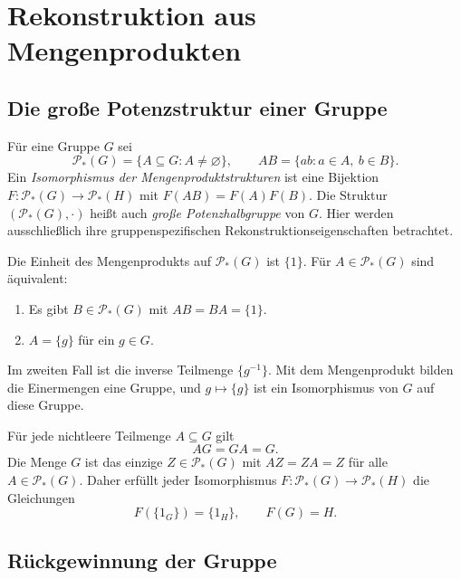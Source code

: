 \chapter{Rekonstruktion aus Mengenprodukten}

\section{Die große Potenzstruktur einer Gruppe}

\begin{definition}
Für eine Gruppe \(G\) sei
\[
 \mathcal P_*(G)=\{A\subseteq G:A\ne\varnothing\},\qquad
 AB=\{ab:a\in A,\ b\in B\}.
\]
Ein \emph{Isomorphismus der Mengenproduktstrukturen}
ist eine Bijektion \(F:\mathcal P_*(G)\to\mathcal P_*(H)\) mit
\(F(AB)=F(A)F(B)\).
Die Struktur \((\mathcal P_*(G),\cdot)\) heißt auch
\emph{große Potenzhalbgruppe} von \(G\).
Hier werden ausschließlich ihre gruppenspezifischen
Rekonstruktionseigenschaften betrachtet.
\end{definition}

\begin{theorem}
\label{b40guide:thm:singletons}
Die Einheit des Mengenprodukts auf \(\mathcal P_*(G)\) ist \(\{1\}\).
Für \(A\in\mathcal P_*(G)\) sind äquivalent:
\begin{enumerate}
\item Es gibt \(B\in\mathcal P_*(G)\) mit \(AB=BA=\{1\}\).
\item \(A=\{g\}\) für ein \(g\in G\).
\end{enumerate}
Im zweiten Fall ist die inverse Teilmenge \(\{g^{-1}\}\).
Mit dem Mengenprodukt bilden die Einermengen eine Gruppe, und
\(g\mapsto\{g\}\) ist ein Isomorphismus von \(G\) auf diese Gruppe.
\cite{projectreconstruction,liutringali}
\end{theorem}

\begin{theorem}
Für jede nichtleere Teilmenge \(A\subseteq G\) gilt
\[
 AG=GA=G.
\]
Die Menge \(G\) ist das einzige \(Z\in\mathcal P_*(G)\) mit
\(AZ=ZA=Z\) für alle \(A\in\mathcal P_*(G)\).
Daher erfüllt jeder Isomorphismus
\(F:\mathcal P_*(G)\to\mathcal P_*(H)\) die Gleichungen~\cite{projectreconstruction}
\[
 F(\{1_G\})=\{1_H\},\qquad F(G)=H.
\]
\end{theorem}

\section{Rückgewinnung der Gruppe}

